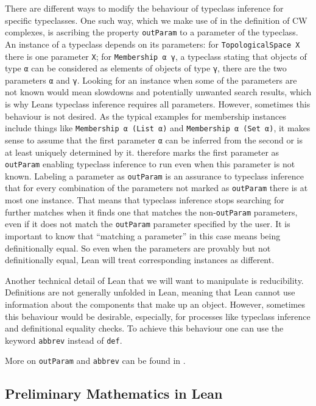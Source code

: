 There are different ways to modify the behaviour of typeclass inference for specific typeclasses. 
One such way, which we make use of in the definition of CW complexes, is ascribing the property \lstinline|outParam| to a parameter of the typeclass. 
An instance of a typeclass depends on its parameters: for \lstinline|TopologicalSpace X| there is one parameter \lstinline|X|; for \lstinline|Membership α γ|, a typeclass stating that objects of type \lstinline|α| can be considered as elements of objects of type \lstinline|γ|, there are the two parameters \lstinline|α| and \lstinline|γ|.
Looking for an instance when some of the parameters are not known would mean slowdowns and potentially unwanted search results, which is why Leans typeclass inference requires all parameters. 
However, sometimes this behaviour is not desired. 
As the typical examples for membership instances include things like \lstinline|Membership α (List α)| and \lstinline|Membership α (Set α)|, it makes sense to assume that the first parameter \lstinline|α| can be inferred from the second or is at least uniquely determined by it. 
\mathlib therefore marks the first parameter as \lstinline|outParam| enabling typeclass inference to run even when this parameter is not known.
Labeling a parameter as \lstinline|outParam| is an assurance to typeclass inference that for every combination of the parameters not marked as \lstinline|outParam| there is at most one instance. 
That means that typeclass inference stops searching for further matches when it finds one that matches the non-\lstinline|outParam| parameters, even if it does not match the \lstinline|outParam| parameter specified by the user. 
It is important to know that ``matching a parameter'' in this case means being definitionally equal. 
So even when the parameters are provably but not definitionally equal, Lean will treat corresponding instances as different. 

Another technical detail of Lean that we will want to manipulate is reducibility.
Definitions are not generally unfolded in Lean, meaning that Lean cannot use information about the components that make up an object. 
However, sometimes this behaviour would be desirable, especially, for processes like typeclass inference and definitional equality checks. 
To achieve this behaviour one can use the keyword \lstinline|abbrev| instead of \lstinline|def|. 

More on \lstinline|outParam| and \lstinline|abbrev| can be found in \cite{LeanReference2025}.


\subsection{Preliminary Mathematics in Lean}\label{sub:mathinlean}

